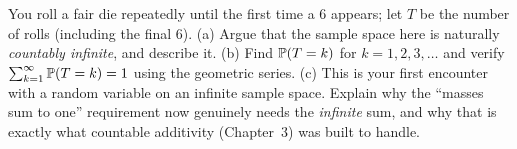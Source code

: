 \begin{exercise}
\label{ch06:ex-modeling}
You roll a fair die repeatedly until the first time a $6$ appears; let $T$ be the
number of rolls (including the final $6$). (a) Argue that the sample space here is
naturally \emph{countably infinite}, and describe it. (b) Find $\P(T = k)$ for
$k = 1, 2, 3, \dots$ and verify $\sum_{k=1}^\infty \P(T=k) = 1$ using the geometric
series. (c) This is your first encounter with a random variable on an infinite sample
space. Explain why the ``masses sum to one'' requirement now genuinely needs the
\emph{infinite} sum, and why that is exactly what countable additivity (Chapter~3) was
built to handle.
\end{exercise}
